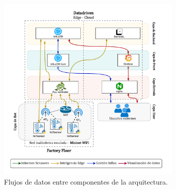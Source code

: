 \begin{figure}[ht!]
    \centering
    \includegraphics[width=0.8\textwidth]{fig/08_datadriven/datadriven_10.drawio.pdf}
    \caption{Flujos de datos entre componentes de la arquitectura.}
    \label{fig:dataflow}
\end{figure}

